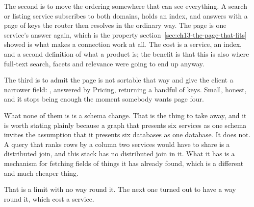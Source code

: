 %
The second is to move the ordering somewhere that can see everything. A search
or listing service subscribes to both domains, holds an index, and answers
 with a page of  keys the router then resolves
in the ordinary way. The page is one service's answer again, which is the
property section~\ref{sec:ch13-the-page-that-fits} showed is what makes a
connection work at all. The cost is a service, an index, and a second definition
of what a product is; the benefit is that this is also where full-text search,
facets and relevance were going to end up anyway.

The third is to admit the page is not sortable that way and give the client a
narrower field: , answered by Pricing, returning a
handful of keys. Small, honest, and it stops being enough the moment somebody
wants page four.

%
What none of them is is a schema change. That is the thing to take away, and it
is worth stating plainly because a graph that presents six services as one
schema invites the assumption that it presents six databases as one database.
It does not. A query that ranks rows by a column two services would have to
share is a distributed join, and this stack has no distributed join in it. What
it has is a mechanism for fetching fields of things it has already found, which
is a different and much cheaper thing.

\medskip
That is a limit with no way round it. The next one turned out to have a way
round it, which cost a service.

%
